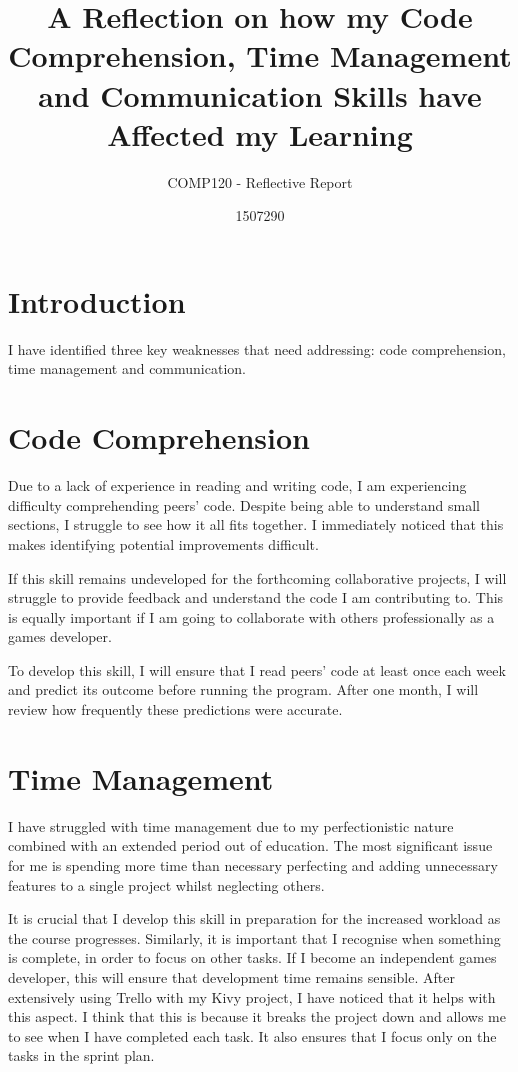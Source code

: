 \documentclass{scrartcl}
\title{A Reflection on how my Code Comprehension, Time Management and Communication Skills have Affected my Learning}
\subtitle{COMP120 - Reflective Report}
\author{1507290}
\begin{document}
\maketitle

\abstract{}

\section{Introduction}
I have identified three key weaknesses that need addressing: code comprehension, time management and communication.

\section{Code Comprehension}
Due to a lack of experience in reading and writing code, I am experiencing difficulty comprehending peers' code. Despite being able to understand small sections, I struggle to see how it all fits together. I immediately noticed that this makes identifying potential improvements difficult.

If this skill remains undeveloped for the forthcoming collaborative projects, I will struggle to provide feedback and understand the code I am contributing to. This is equally important if I am going to collaborate with others professionally as a games developer.

To develop this skill, I will ensure that I read peers' code at least once each week and predict its outcome before running the program. After one month, I will review how frequently these predictions were accurate.

\section{Time Management}
I have struggled with time management due to my perfectionistic nature combined with an extended period out of education. The most significant issue for me is spending more time than necessary perfecting and adding unnecessary features to a single project whilst neglecting others.

It is crucial that I develop this skill in preparation for the increased workload as the course progresses. Similarly, it is important that I recognise when something is complete, in order to focus on other tasks. If I become an independent games developer, this will ensure that development time remains sensible. After extensively using Trello with my Kivy project, I have noticed that it helps with this aspect. I think that this is because it breaks the project down and allows me to see when I have completed each task. It also ensures that I focus only on the tasks in the sprint plan.
\end{document}
